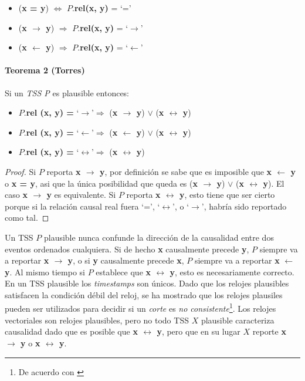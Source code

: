 \documentclass[12pt, times]{simauth}
\begin{document}
\begin{itemize}
    \item (\textbf{x = y}) $\Leftrightarrow$ $P$.\textbf{rel(x, y)} =  \textquoteleft=\textquoteright 
    \item (\textbf{x $\to$ y}) $\Rightarrow$ $P$.\textbf{rel(x, y)} =  \textquoteleft$\to$\textquoteright 
    \item (\textbf{x $\leftarrow$ y}) $\Rightarrow$ $P$.\textbf{rel(x, y)} =  \textquoteleft$\leftarrow$\textquoteright            
\end{itemize}

\paragraph{Teorema 2 (Torres)} Si un \emph{TSS P} es plausible entonces:
\begin{itemize}
    \item $P$.\textbf{rel (x, y) =} \textquoteleft$\to$\textquoteright $\Rightarrow$ (\textbf{x $\to$ y}) $\lor$ (\textbf{x $\leftrightarrow$ y})
    \item $P$.\textbf{rel (x, y) =} \textquoteleft$\leftarrow$\textquoteright $\Rightarrow$ (\textbf{x $\leftarrow$ y}) $\lor$ (\textbf{x $\leftrightarrow$ y}) 
    \item $P$.\textbf{rel (x, y) =} \textquoteleft$\leftrightarrow$\textquoteright $\Rightarrow$ (\textbf{x $\leftrightarrow$ y})       
\end{itemize}

\begin{proof}
Si $P$ reporta \textbf{x $\to$ y}, por definición se sabe que es imposible que \textbf{x $\leftarrow$ y} o \textbf{x = y}, asi que la única posibilidad que queda es (\textbf{x $\to$ y}) $\lor$ (\textbf{x $\leftrightarrow$ y}). El caso \textbf{x $\to$ y} es equivalente. Si $P$ reporta \textbf{x $\leftrightarrow$ y}, esto tiene que ser cierto porque si la relación causal real fuera \textquoteleft=\textquoteright, \textquoteleft$\leftrightarrow$\textquoteright, o \textquoteleft$\to$\textquoteright, habría sido reportado como tal.
\end{proof}

Un TSS $P$ plausible nunca confunde la dirección de la causalidad entre dos eventos ordenados cualquiera. Si de hecho \textbf{x} causalmente precede \textbf{y}, $P$ siempre va a reportar \textbf{x $\to$ y}, o si \textbf{y} causalmente precede \textbf{x}, $P$ siempre va a reportar \textbf{x} $\leftarrow$ \textbf{y}. Al mismo tiempo si $P$ establece que \textbf{x $\leftrightarrow$ y}, esto es necesariamente correcto. En un TSS plausible los \emph{timestamps} son únicos. Dado que los relojes plausibles satisfacen la condición débil del reloj, se ha mostrado que los relojes plausiles pueden ser utilizados para decidir si un \emph{corte} es \emph{no consistente}\footnote{De acuerdo con \cite{mattern}}. Los relojes vectoriales son relojes plausibles, pero no todo TSS $X$ plausible caracteriza causalidad dado que es posible que \textbf{x $\leftrightarrow$ y}, pero que en su lugar $X$ reporte \textbf{x $\to$ y} o \textbf{x $\leftrightarrow$ y}. 
 
\end{document}
